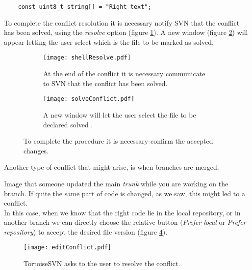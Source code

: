 \begin{verbatim}
    const uint8_t string[] = "Right text";
\end{verbatim}


To complete the conflict resolution it is necessary notify SVN that the conflict has been solved, using the \textit{resolve} option (figure \ref{fig:shellResolve}). A new window (figure \ref{fig:solveConflict}) will appear letting the user select which is the file to be marked as solved.\newline

\begin{figure}[htbp]
\begin{subfigure}{0.5\textwidth}
  \centering
  \texttt{[image: shellResolve.pdf]}
  \caption{At the end of the conflict it is necessary communicate to SVN that the conflict has been solved.}
  \label{fig:shellResolve}
\end{subfigure}%
\begin{subfigure}{0.5\textwidth}
  \centering
  \texttt{[image: solveConflict.pdf]}
  \caption{A new window will let the user select the file to be declared solved .}
  \label{fig:solveConflict}
\end{subfigure}
\caption{To complete the procedure it is necessary confirm the accepted changes.}
\label{fig:solveConflicts}
\end{figure}

Another type of conflict that might arise, is when branches are merged.

Image that someone updated the main \textit{trunk} while you are working on the branch. If quite the same part of code is changed, as we saw, this might led to a conflict.\\


In this case, when we know that the right code lie in the local repository, or in another branch we can directly choose the relative button (\textit{Prefer local} or \textit{Prefer repository}) to accept the desired file version (figure \ref{fig:editConflict}).\\


\begin{figure}[ht!]
    \centering
    \texttt{[image: editConflict.pdf]}
    \caption{TortoiseSVN asks to the user to resolve the conflict.}
    \label{fig:editConflict}
\end{figure}


